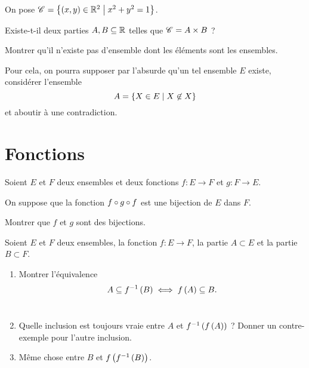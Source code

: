 \begin{corr}
\end{corr}

\begin{exo}[Exercice 3]
On pose \(\mathscr{C}^{}=\left\lbrace\left(x,y\right)\in\mathbb{R}^2\;\middle|\; x^2+y^2=1\right\rbrace\).

Existe-t-il deux parties \(A,B\subseteq\mathbb{R}\) telles que \(\mathscr{C}^{}=A\times B\) ?
\end{exo}

\begin{corr}
\end{corr}

\begin{exo}
Montrer qu'il n'existe pas d'ensemble dont les éléments sont les ensembles.

Pour cela, on pourra supposer par l'absurde qu'un tel ensemble \(E\) existe, considérer l'ensemble \[A=\left\lbrace X\in E\;\middle|\; X\not\in X\right\rbrace\] et aboutir à une contradiction.
\end{exo}

\begin{corr}
\end{corr}

\section{Fonctions}

\begin{exo}[Exercice 5]
Soient \(E\) et \(F\) deux ensembles et deux fonctions \(f:E\to F\) et \(g:F\to E\).

On suppose que la fonction \(f\circ g\circ f\) est une bijection de \(E\) dans \(F\).

Montrer que \(f\) et \(g\) sont des bijections.
\end{exo}

\begin{corr}
\end{corr}

\begin{exo}
Soient \(E\) et \(F\) deux ensembles, la fonction \(f:E\to F\), la partie \(A\subset E\) et la partie \(B\subset F\).

\begin{enumerate}
\item Montrer l'équivalence \[A\subseteq f^{-1}\left(B\right)\iff f\left(A\right)\subseteq B.\] \\

\item Quelle inclusion est toujours vraie entre \(A\) et \(f^{-1}\left(f\left(A\right)\right)\) ? Donner un contre-exemple pour l'autre inclusion. \\

\item Même chose entre \(B\) et \(f\left(f^{-1}\left(B\right)\right)\).
\end{enumerate}
\end{exo}

